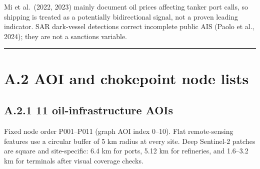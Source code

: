 \documentclass[
  british,
  12pt,
  oneside]{book}
\begin{document}
{Mi et al.~(2022, 2023) mainly document oil prices affecting tanker port
calls, so shipping is treated as a potentially bidirectional signal, not
a proven leading indicator. SAR dark-vessel detections correct incomplete
public AIS (Paolo et al., 2024); they are not a sanctions variable.

\begin{center}\rule{0.5\linewidth}{0.5pt}\end{center}

\section*{A.2 AOI and chokepoint node lists}\label{a.2-aoi-and-chokepoint-node-lists}

\subsection*{A.2.1 11 oil-infrastructure AOIs}\label{a.2.1-11-oil-infrastructure-aois}

Fixed node order P001--P011 (graph AOI index 0--10). Flat remote-sensing
features use a circular buffer of 5 km radius at every site. Deep Sentinel-2
patches are square and site-specific: 6.4 km for ports, 5.12 km for
refineries, and 1.6--3.2 km for terminals after visual coverage checks.

}
\end{document}
